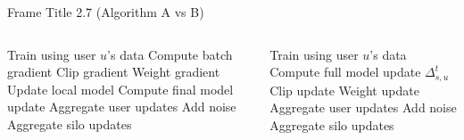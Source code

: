 \documentclass{beamer}
\begin{document}
\begin{frame}{Frame Title 2.7 (Algorithm A vs B)} %
    \begin{columns}[T]
        \begin{algorithm}[H]
            \caption{Placeholder Algorithm A}
            \begin{algorithmic}[1]\tiny
                        \State Train using user $u$'s data
                            \State Compute batch gradient
                            \State Clip gradient
                            \State Weight gradient
                            \State Update local model
                        \EndFor
                        \State Compute final model update
                    \EndFor
                    \State Aggregate user updates
                    \State Add noise
                \EndFor
                \State Aggregate silo updates
            \end{algorithmic}
        \end{algorithm}

        \begin{algorithm}[H]
            \caption{Placeholder Algorithm B}
            \begin{algorithmic}[1]\tiny
                        \State Train using user $u$'s data
                        \State \colorbox{lightorange}{Compute full model update $\Delta_{s,u}^t$}
                        \State Clip update
                        \State Weight update
                    \EndFor
                    \State Aggregate user updates
                    \State Add noise
                \EndFor
                \State Aggregate silo updates
            \end{algorithmic}
        \end{algorithm}
    \end{columns}


\end{frame}
\end{document}
